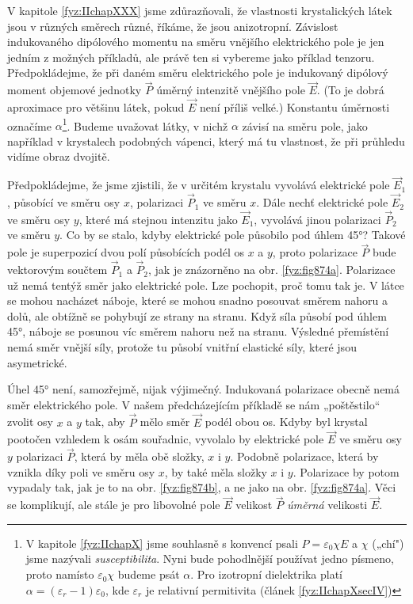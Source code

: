     V kapitole \ref{fyz:IIchapXXX} jsme zdůrazňovali, že vlastnosti krystalických látek jsou v
    různých směrech různé, říkáme, že jsou anizotropní. Závislost indukovaného dipólového momentu na
    směru vnějšího elektrického pole je jen jedním z možných příkladů, ale právě ten si vybereme
    jako příklad tenzoru. Předpokládejme, že při daném směru elektrického pole je indukovaný
    dipólový moment objemové jednotky \(\vec{P}\) úměrný intenzitě vnějšího pole \(\vec{E}\). (To je
    dobrá aproximace pro většinu látek, pokud \(\vec{E}\) není příliš velké.) Konstantu úměrnosti
    označíme \(\alpha\)\footnote{V kapitole \ref{fyz:IIchapX} jsme souhlasně s konvencí psali
    \(P=\varepsilon_0\chi E\) a \(\chi\) („chí") jsme nazývali \emph{susceptibilita}. Nyni bude
    pohodlnější používat jedno písmeno, proto namísto \(\varepsilon_0\chi\) budeme psát \(\alpha\).
    Pro izotropní dielektrika platí \(\alpha = (\varepsilon_r - 1)\varepsilon_0\), kde
    \(\varepsilon_r\) je relativní permitivita (článek \ref{fyz:IIchapXsecIV})}. Budeme uvažovat
    látky, v nichž \(\alpha\) závisí na směru pole, jako například v krystalech podobných vápenci,
    který má tu vlastnost, že při průhledu vidíme obraz dvojitě. 

    Předpokládejme, že jsme zjistili, že v určitém krystalu vyvolává elektrické pole \(\vec{E}_1\),
    působící ve směru osy \(x\), polarizaci \(\vec{P}_1\) ve směru \(x\). Dále nechť elektrické pole
    \(\vec{E}_2\) ve směru osy \(y\), které má stejnou intenzitu jako \(\vec{E}_1\), vyvolává jinou
    polarizaci \(\vec{P}_2\) ve směru \(y\). Co by se stalo, kdyby elektrické pole působilo pod
    úhlem \ang{45}? Takové pole je superpozicí dvou polí působících podél os \(x\) a \(y\), proto
    polarizace \(\vec{P}\) bude vektorovým součtem \(\vec{P}_1\) a \(\vec{P}_2\), jak je znázorněno
    na obr. \ref{fyz:fig874a}. Polarizace už nemá tentýž směr jako elektrické pole. Lze pochopit,
    proč tomu tak je. V látce se mohou nacházet náboje, které se mohou snadno posouvat směrem nahoru
    a dolů, ale obtížně se pohybují ze strany na stranu. Když síla působí pod úhlem \ang{45}, náboje
    se posunou víc směrem nahoru než na stranu. Výsledné přemístění nemá směr vnější síly, protože
    tu působí vnitřní elastické síly, které jsou asymetrické.
    
    Úhel \ang{45} není, samozřejmě, nijak výjimečný. Indukovaná polarizace obecně nemá směr
    elektrického pole. V našem předcházejícím příkladě se nám „poštěstilo“ zvolit osy \(x\) a \(y\)
    tak, aby \(\vec{P}\) mělo směr \(\vec{E}\) podél obou os. Kdyby byl krystal pootočen vzhledem k
    osám souřadnic, vyvolalo by elektrické pole \(\vec{E}\) ve směru osy \(y\) polarizaci
    \(\vec{P}\), která by měla obě složky, \(x\) i \(y\). Podobně polarizace, která by vznikla díky
    poli ve směru osy \(x\), by také měla složky \(x\) i \(y\). Polarizace by potom vypadaly tak,
    jak je to na obr. \ref{fyz:fig874b}, a ne jako na obr. \ref{fyz:fig874a}. Věci se komplikují,
    ale stále je pro libovolné pole \(\vec{E}\) velikost \(\vec{P}\) \emph{úměrná} velikosti
    \(\vec{E}\). 
    
